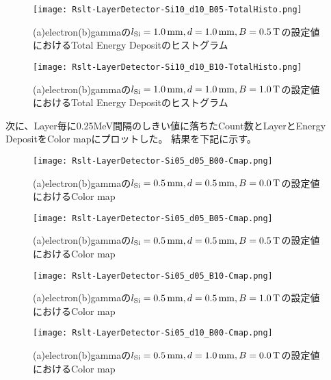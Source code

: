 \documentclass[a4paper,10pt]{jreport}
\begin{document}
\begin{figure}[H]
	\center
	\texttt{[image: Rslt-LayerDetector-Si10\_d10\_B05-TotalHisto.png]}
	\caption{(a)electron(b)gammaの$l_{\rm{Si}}=\SI{1.0}{mm}, d=\SI{1.0}{mm}, B=\SI{0.5}{T}$の設定値におけるTotal Energy Depositのヒストグラム}
	\label{Rslt-LayerDetector-Si10_d10_B05-TotalHisto}
\end{figure}

\begin{figure}[H]
	\center
	\texttt{[image: Rslt-LayerDetector-Si10\_d10\_B10-TotalHisto.png]}
	\caption{(a)electron(b)gammaの$l_{\rm{Si}}=\SI{1.0}{mm}, d=\SI{1.0}{mm}, B=\SI{1.0}{T}$の設定値におけるTotal Energy Depositのヒストグラム}
	\label{Rslt-LayerDetector-Si05_d05_B00-TotalHisto}
\end{figure}

次に、Layer毎に0.25MeV間隔のしきい値に落ちたCount数とLayerとEnergy DepositをColor mapにプロットした。
結果を下記に示す。

\begin{figure}[H]
	\center
	\texttt{[image: Rslt-LayerDetector-Si05\_d05\_B00-Cmap.png]}
	\caption{(a)electron(b)gammaの$l_{\rm{Si}}=\SI{0.5}{mm}, d=\SI{0.5}{mm}, B=\SI{0.0}{T}$の設定値におけるColor map}
	\label{Rslt-LayerDetector-Si05_d05_B00-Cmap}
\end{figure}

\begin{figure}[H]
	\center
	\texttt{[image: Rslt-LayerDetector-Si05\_d05\_B05-Cmap.png]}
	\caption{(a)electron(b)gammaの$l_{\rm{Si}}=\SI{0.5}{mm}, d=\SI{0.5}{mm}, B=\SI{0.5}{T}$の設定値におけるColor map}
	\label{Rslt-LayerDetector-Si05_d05_B05-Cmap}
\end{figure}

\begin{figure}[H]
	\center
	\texttt{[image: Rslt-LayerDetector-Si05\_d05\_B10-Cmap.png]}
	\caption{(a)electron(b)gammaの$l_{\rm{Si}}=\SI{0.5}{mm}, d=\SI{0.5}{mm}, B=\SI{1.0}{T}$の設定値におけるColor map}
	\label{Rslt-LayerDetector-Si05_d05_B10-Cmap}
\end{figure}

\begin{figure}[H]
	\center
	\texttt{[image: Rslt-LayerDetector-Si05\_d10\_B00-Cmap.png]}
	\caption{(a)electron(b)gammaの$l_{\rm{Si}}=\SI{0.5}{mm}, d=\SI{1.0}{mm}, B=\SI{0.0}{T}$の設定値におけるColor map}
	\label{Rslt-LayerDetector-Si05_d10_B00-Cmap}
\end{figure}
\end{document}

